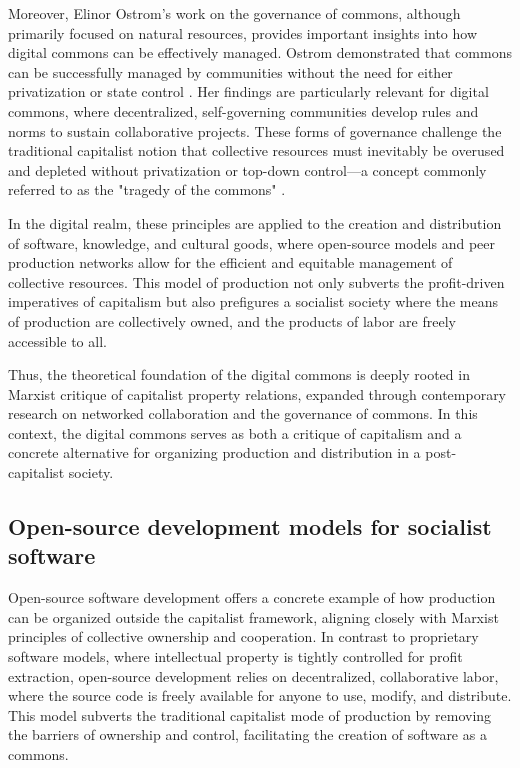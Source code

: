 \begin{refsection}
Moreover, Elinor Ostrom’s work on the governance of commons, although primarily focused on natural resources, provides important insights into how digital commons can be effectively managed. Ostrom demonstrated that commons can be successfully managed by communities without the need for either privatization or state control \cite[pp.~77-79]{ostrom1990}. Her findings are particularly relevant for digital commons, where decentralized, self-governing communities develop rules and norms to sustain collaborative projects. These forms of governance challenge the traditional capitalist notion that collective resources must inevitably be overused and depleted without privatization or top-down control—a concept commonly referred to as the "tragedy of the commons" \cite[pp.~56-57]{bollier2016}.

In the digital realm, these principles are applied to the creation and distribution of software, knowledge, and cultural goods, where open-source models and peer production networks allow for the efficient and equitable management of collective resources. This model of production not only subverts the profit-driven imperatives of capitalism but also prefigures a socialist society where the means of production are collectively owned, and the products of labor are freely accessible to all.

Thus, the theoretical foundation of the digital commons is deeply rooted in Marxist critique of capitalist property relations, expanded through contemporary research on networked collaboration and the governance of commons. In this context, the digital commons serves as both a critique of capitalism and a concrete alternative for organizing production and distribution in a post-capitalist society.

\subsection{Open-source development models for socialist software}

Open-source software development offers a concrete example of how production can be organized outside the capitalist framework, aligning closely with Marxist principles of collective ownership and cooperation. In contrast to proprietary software models, where intellectual property is tightly controlled for profit extraction, open-source development relies on decentralized, collaborative labor, where the source code is freely available for anyone to use, modify, and distribute. This model subverts the traditional capitalist mode of production by removing the barriers of ownership and control, facilitating the creation of software as a commons.


\end{refsection}
